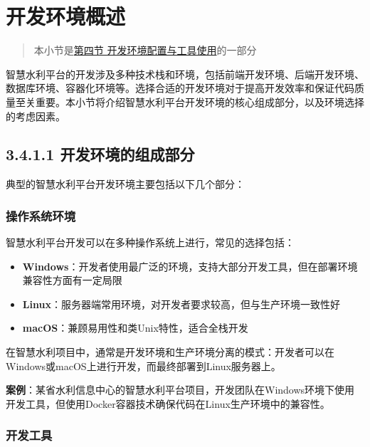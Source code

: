 \section{开发环境概述}\label{ux5f00ux53d1ux73afux5883ux6982ux8ff0}

\begin{quote}
本小节是\href{section03-04.md}{第四节 开发环境配置与工具使用}的一部分
\end{quote}

智慧水利平台的开发涉及多种技术栈和环境，包括前端开发环境、后端开发环境、数据库环境、容器化环境等。选择合适的开发环境对于提高开发效率和保证代码质量至关重要。本小节将介绍智慧水利平台开发环境的核心组成部分，以及环境选择的考虑因素。

\subsection{3.4.1.1
开发环境的组成部分}\label{ux5f00ux53d1ux73afux5883ux7684ux7ec4ux6210ux90e8ux5206}

典型的智慧水利平台开发环境主要包括以下几个部分：

\subsubsection{操作系统环境}\label{ux64cdux4f5cux7cfbux7edfux73afux5883}

智慧水利平台开发可以在多种操作系统上进行，常见的选择包括：

\begin{itemize}
\tightlist
\item
  \textbf{Windows}：开发者使用最广泛的环境，支持大部分开发工具，但在部署环境兼容性方面有一定局限
\item
  \textbf{Linux}：服务器端常用环境，对开发者要求较高，但与生产环境一致性好
\item
  \textbf{macOS}：兼顾易用性和类Unix特性，适合全栈开发
\end{itemize}

在智慧水利项目中，通常是开发环境和生产环境分离的模式：开发者可以在Windows或macOS上进行开发，而最终部署到Linux服务器上。

\textbf{案例}：某省水利信息中心的智慧水利平台项目，开发团队在Windows环境下使用开发工具，但使用Docker容器技术确保代码在Linux生产环境中的兼容性。

\subsubsection{开发工具}\label{ux5f00ux53d1ux5de5ux5177}

